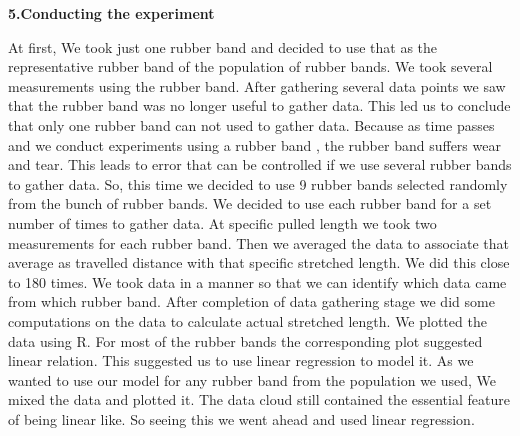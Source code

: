 \begin{center}
\textbf{{\huge 5.Conducting the experiment}}
\end{center}
\vspace{ 2 mm}
At first,  We took just one rubber band and decided to use that as the representative rubber band of the population of rubber bands. We took several measurements using the  rubber band. After gathering several data points we saw that the rubber band was no longer useful to gather data. This led us to conclude that only one rubber band can not used to gather data. Because as time passes and we conduct experiments using a rubber band , the rubber band suffers wear and tear. This leads to error that can be controlled if we use several rubber bands to  gather data. So, this time we decided to use 9 rubber bands selected randomly  from the bunch of rubber bands. We decided to use each rubber band for a set number of times to gather data. At specific pulled length we took two measurements for each rubber band. Then we averaged the data to associate that average as travelled distance with that specific stretched length. We did this close to 180 times. We  took data in a manner so that we can identify which data came from which rubber band. After completion of data gathering stage we did some computations on the data to calculate actual stretched length. We plotted the data using R. For most of the rubber bands the corresponding plot suggested linear relation. This suggested us to use linear regression to model it. As we wanted to use our model for any rubber band from the population we used, We mixed the data and plotted it. The data cloud still contained the essential feature of being linear like. So seeing this we went ahead and used linear regression.
